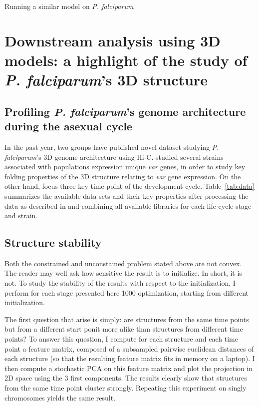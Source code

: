 \documentclass[letterpaper,12pt]{article}
\begin{document}
Running a similar model on {\em P. falciparum}

\section*{Downstream analysis using 3D models: a highlight of the study of
{\em P. falciparum}'s 3D structure}

\subsection*{Profiling {\em P. falciparum}'s genome architecture during the
asexual cycle}
\label{sec:data}

In the past year, two groups have published novel dataset studying {\em P.
falciparum}'s 3D genome architecture using Hi-C. \citet{lemieux:genome-wide}
studied several strains associated with populations expression unique
\textit{var} genes, in order to study key folding properties of the 3D
structure relating to \textit{var} gene expression. On the other hand,
\citet{ay:three-dimensional} focus three key time-point of the development
cycle. Table~\ref{tab:data} summarizes the available data sets and their key
properties after processing the data as described in
\citet{ay:three-dimensional} and combining all available libraries for each
life-cycle stage and strain.

\subsection*{Structure stability}

Both the constrained and unconstained problem stated above are not convex. The
reader may well ask how sensitive the result is to initialize. In short, it is
not. To study the stability of the results with respect to the initialization,
I perform for each stage presented here 1000 optimization, starting from
different initialization. 

The first question that arise is simply: are structures from the same time
points but from a different start ponit more alike than structures from
different time points? To answer this question, I compute for each structure
and each time point a feature matrix, composed of a subsampled pairwise
euclidean distances of each structure (so that the resulting feature matrix
fits in memory on a laptop). I then compute a stochastic PCA on this feature
matrix and plot the projection in 2D space using the 3 first components. The
results clearly show that structures from the same time point cluster
strongly. Repeating this experiment on singly chromosomes yields the same
result.
\end{document}
